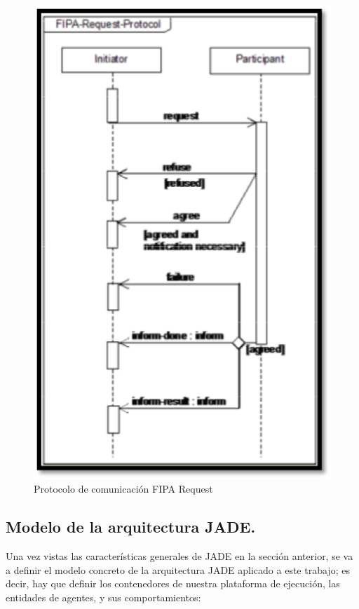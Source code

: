 \begin{figure}[t]
\centering
\includegraphics[scale=0.75]{img/6/fipaRequest}
\caption{Protocolo de comunicación FIPA Request
\label{fig:fipaRequest}}
\end{figure}






\subsection{Modelo de la arquitectura JADE.}

Una vez vistas las características generales de JADE en la sección anterior, se va a definir el modelo concreto de la arquitectura JADE aplicado a este trabajo; es decir, hay que definir los contenedores de nuestra plataforma de ejecución, las entidades de agentes, y sus comportamientos:

